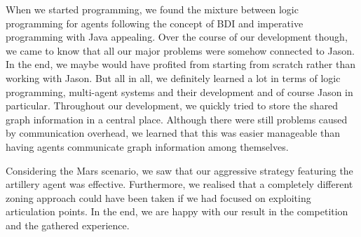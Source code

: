 When we started programming, we found the mixture between logic programming for agents following the concept of BDI and imperative programming with Java appealing.
Over the course of our development though, we came to know that all our major problems were somehow connected to Jason.
In the end, we maybe would have profited from starting from scratch rather than working with Jason.
But all in all, we definitely learned a lot in terms of logic programming, multi-agent systems and their development and of course Jason in particular.
Throughout our development, we quickly tried to store the shared graph information in a central place.
Although there were still problems caused by communication overhead, we learned that this was easier manageable than having agents communicate graph information among themselves.

Considering the Mars scenario, we saw that our aggressive strategy featuring the artillery agent was effective.
Furthermore, we realised that a completely different zoning approach could have been taken if we had focused on exploiting articulation points.
In the end, we are happy with our result in the competition and the gathered experience.
